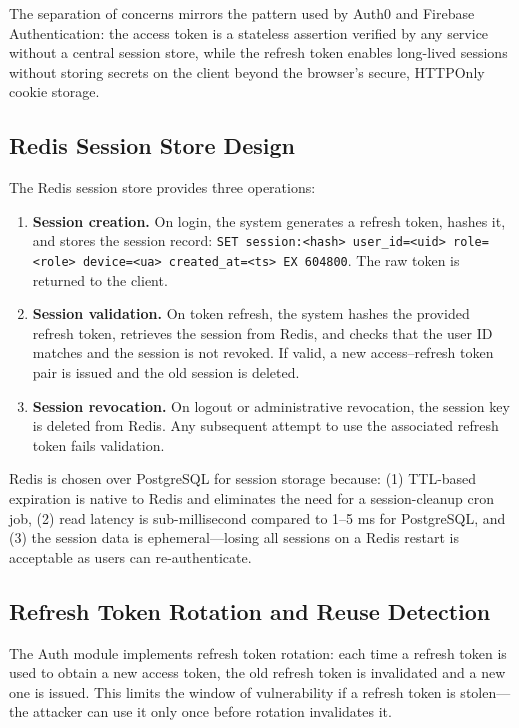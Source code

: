 The separation of concerns mirrors the pattern used by Auth0 and Firebase Authentication: the access token is a stateless assertion verified by any service without a central session store, while the refresh token enables long-lived sessions without storing secrets on the client beyond the browser's secure, HTTPOnly cookie storage.

\subsection{Redis Session Store Design}

The Redis session store provides three operations:

\begin{enumerate}
  \item \textbf{Session creation.} On login, the system generates a refresh token, hashes it, and stores the session record: \texttt{SET session:<hash> user\_id=<uid> role=<role> device=<ua> created\_at=<ts> EX 604800}. The raw token is returned to the client.
  \item \textbf{Session validation.} On token refresh, the system hashes the provided refresh token, retrieves the session from Redis, and checks that the user ID matches and the session is not revoked. If valid, a new access--refresh token pair is issued and the old session is deleted.
  \item \textbf{Session revocation.} On logout or administrative revocation, the session key is deleted from Redis. Any subsequent attempt to use the associated refresh token fails validation.
\end{enumerate}

Redis is chosen over PostgreSQL for session storage because: (1) TTL-based expiration is native to Redis and eliminates the need for a session-cleanup cron job, (2) read latency is sub-millisecond compared to 1--5 ms for PostgreSQL, and (3) the session data is ephemeral---losing all sessions on a Redis restart is acceptable as users can re-authenticate.

\subsection{Refresh Token Rotation and Reuse Detection}

The Auth module implements refresh token rotation: each time a refresh token is used to obtain a new access token, the old refresh token is invalidated and a new one is issued. This limits the window of vulnerability if a refresh token is stolen---the attacker can use it only once before rotation invalidates it.

